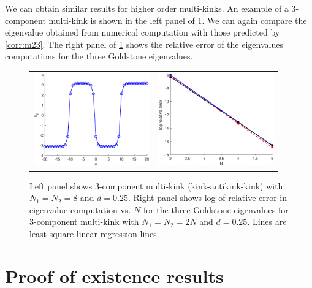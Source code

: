 \documentclass[12pt]{article}
\begin{document}
We can obtain similar results for higher order multi-kinks. An example of a 3-component multi-kink is shown in the left panel of \cref{fig:3p}. We can again compare the eigenvalue obtained from numerical computation with those predicted by \cref{corr:m23}. The right panel of \cref{fig:3p} shows the relative error of the eigenvalues computations for the three Goldstone eigenvalues.

\begin{figure}[H]
	\begin{center}
	\begin{tabular}{cc}
	\includegraphics[width=5cm]{3kink.eps} &
	\includegraphics[width=5cm]{goldstone3prelerror.eps}
	\end{tabular}
	\end{center}
	\caption{Left panel shows 3-component multi-kink (kink-antikink-kink) with $N_1 = N_2 = 8$ and $d = 0.25$. Right panel shows log of relative error in eigenvalue computation vs. $N$ for the three Goldstone eigenvalues for 3-component multi-kink with $N_1 = N_2 = 2N$ and $d = 0.25$. Lines are least square linear regression lines.} 
	\label{fig:3p}
\end{figure}


\section{Proof of existence results}
\end{document}
